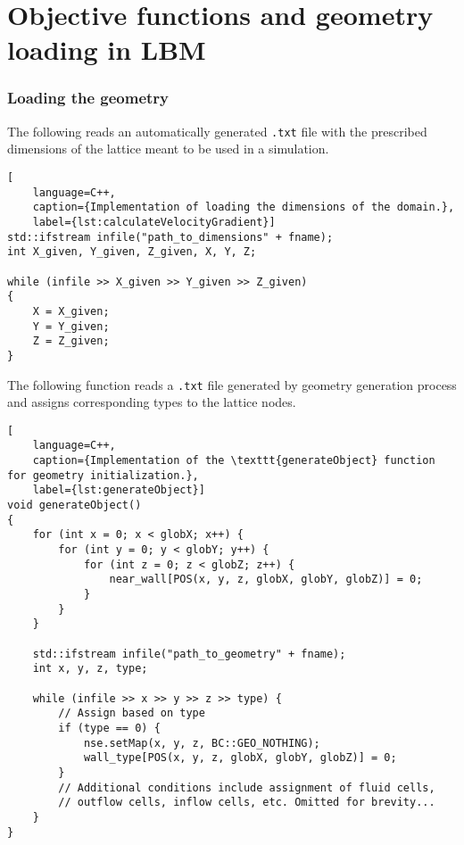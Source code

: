 \chapter{Objective functions and geometry loading in LBM}\label{appendix A}

\subsection*{Loading the geometry}
The following reads an automatically generated \texttt{.txt} file with the prescribed dimensions of the lattice meant to be used in a simulation.
\begin{lstlisting}[
	language=C++,
	caption={Implementation of loading the dimensions of the domain.},
	label={lst:calculateVelocityGradient}]
std::ifstream infile("path_to_dimensions" + fname);
int X_given, Y_given, Z_given, X, Y, Z;

while (infile >> X_given >> Y_given >> Z_given)
{
	X = X_given;
	Y = Y_given;
	Z = Z_given;
}
\end{lstlisting}

The following function reads a \texttt{.txt} file generated by geometry generation process and assigns corresponding types to the lattice nodes.

\begin{lstlisting}[
	language=C++,
	caption={Implementation of the \texttt{generateObject} function for geometry initialization.},
	label={lst:generateObject}]
void generateObject()
{
	for (int x = 0; x < globX; x++) {
		for (int y = 0; y < globY; y++) {
			for (int z = 0; z < globZ; z++) {
				near_wall[POS(x, y, z, globX, globY, globZ)] = 0;
			}
		}
	}
	
	std::ifstream infile("path_to_geometry" + fname);
	int x, y, z, type;
	
	while (infile >> x >> y >> z >> type) {
		// Assign based on type
		if (type == 0) {
			nse.setMap(x, y, z, BC::GEO_NOTHING);
			wall_type[POS(x, y, z, globX, globY, globZ)] = 0;
		}
		// Additional conditions include assignment of fluid cells,
		// outflow cells, inflow cells, etc. Omitted for brevity...
	}
}
\end{lstlisting}

